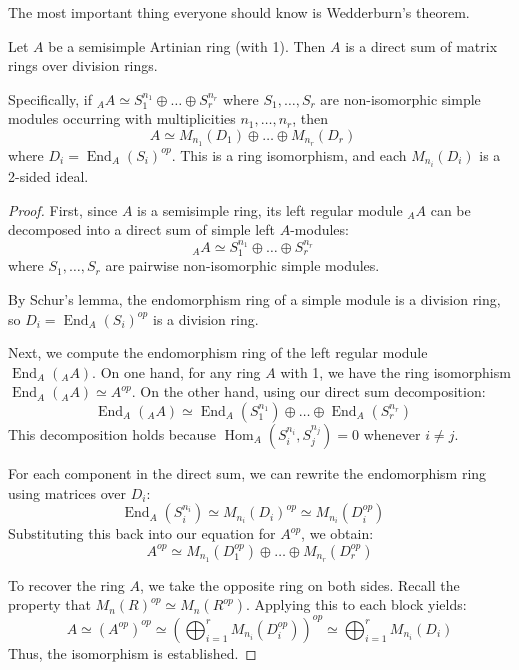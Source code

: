 The most important thing everyone should know is Wedderburn's theorem.

\begin{theorem}
    Let $A$ be a semisimple Artinian ring (with 1). Then $A$ is a direct sum of matrix rings over division rings.

    Specifically, if ${}_A A \simeq S_1^{n_1} \oplus \dots \oplus S_r^{n_r}$ where $S_1, \dots, S_r$ are non-isomorphic simple modules occurring with multiplicities $n_1, \dots, n_r$, then
    \[
        A \simeq M_{n_1}(D_1) \oplus \dots \oplus M_{n_r}(D_r) \quad
    \]
    where $D_i = \operatorname{End}_A(S_i)^{op}$. This is a ring isomorphism, and each $M_{n_i}(D_i)$ is a 2-sided ideal.
\end{theorem}

\begin{proof}
    First, since $A$ is a semisimple ring, its left regular module ${}_A A$ can be decomposed into a direct sum of simple left $A$-modules:
    \[
        {}_A A \simeq S_1^{n_1} \oplus \dots \oplus S_r^{n_r} \quad
    \]
    where $S_1, \dots, S_r$ are pairwise non-isomorphic simple modules.

    By Schur's lemma, the endomorphism ring of a simple module is a division ring, so $D_i = \operatorname{End}_A(S_i)^{op}$ is a division ring.

    Next, we compute the endomorphism ring of the left regular module $\operatorname{End}_A({}_A A)$. On one hand, for any ring $A$ with 1, we have the ring isomorphism $\operatorname{End}_A({}_A A) \simeq A^{op}$. On the other hand, using our direct sum decomposition:
    \[
        \operatorname{End}_A({}_A A) \simeq \operatorname{End}_A(S_1^{n_1}) \oplus \dots \oplus \operatorname{End}_A(S_r^{n_r}) \quad
    \]
    This decomposition holds because $\operatorname{Hom}_A(S_i^{n_i}, S_j^{n_j}) = 0$ whenever $i \neq j$.

    For each component in the direct sum, we can rewrite the endomorphism ring using matrices over $D_i$:
    \[
        \operatorname{End}_A(S_i^{n_i}) \simeq M_{n_i}(D_i)^{op} \simeq M_{n_i}(D_i^{op}) \quad
    \]
    Substituting this back into our equation for $A^{op}$, we obtain:
    \[
        A^{op} \simeq M_{n_1}(D_1^{op}) \oplus \dots \oplus M_{n_r}(D_r^{op})
    \]

    To recover the ring $A$, we take the opposite ring on both sides. Recall the property that $M_n(R)^{op} \simeq M_n(R^{op})$. Applying this to each block yields:
    \[
        A \simeq (A^{op})^{op} \simeq \left( \bigoplus_{i=1}^r M_{n_i}(D_i^{op}) \right)^{op} \simeq \bigoplus_{i=1}^r M_{n_i}(D_i)
    \]
    Thus, the isomorphism is established.
\end{proof}

